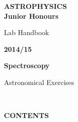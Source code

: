 \documentclass[12pt]{article}
\begin{document}
\pagestyle{empty}
\centering
\vspace*{2cm}

{\Huge\bf ASTROPHYSICS \\ Junior Honours
\vspace*{3mm}

 Lab Handbook}
\vspace*{1cm}

{\Huge\bf 2014/15}
\vspace*{1cm}

\vspace*{3cm}

{\huge\bf Spectroscopy

Astronomical Exercises


}

~
\newpage

\centering
{\Large\bf CONTENTS}
\vspace*{2cm}

\raggedright
\end{document}
